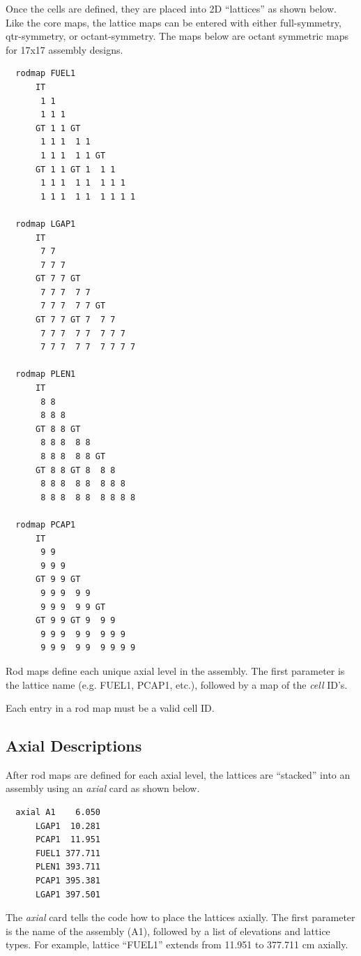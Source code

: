 Once the cells are defined, they are placed into 2D ``lattices'' as shown below.
Like the core maps, the lattice maps can be entered with either full-symmetry, qtr-symmetry,
or octant-symmetry.  The maps below are octant symmetric maps for 17x17 assembly designs.
\vfill   %
\begin{verbatim}
  rodmap FUEL1
      IT
       1 1
       1 1 1
      GT 1 1 GT
       1 1 1  1 1
       1 1 1  1 1 GT
      GT 1 1 GT 1  1 1
       1 1 1  1 1  1 1 1
       1 1 1  1 1  1 1 1 1

  rodmap LGAP1
      IT
       7 7
       7 7 7
      GT 7 7 GT
       7 7 7  7 7
       7 7 7  7 7 GT
      GT 7 7 GT 7  7 7
       7 7 7  7 7  7 7 7
       7 7 7  7 7  7 7 7 7

  rodmap PLEN1
      IT
       8 8
       8 8 8
      GT 8 8 GT
       8 8 8  8 8
       8 8 8  8 8 GT
      GT 8 8 GT 8  8 8
       8 8 8  8 8  8 8 8
       8 8 8  8 8  8 8 8 8

  rodmap PCAP1
      IT
       9 9
       9 9 9
      GT 9 9 GT
       9 9 9  9 9
       9 9 9  9 9 GT
      GT 9 9 GT 9  9 9
       9 9 9  9 9  9 9 9
       9 9 9  9 9  9 9 9 9
\end{verbatim}

Rod maps define each unique axial level in the assembly.
The first parameter is the lattice name (e.g. FUEL1, PCAP1, etc.),
followed by a map of the {\it cell} ID's.

Each entry in a rod map must be a valid cell ID.

\subsection{Axial Descriptions}

After rod maps are defined for each axial level, the lattices are ``stacked'' into
an assembly using an {\it axial} card as shown below.

\begin{verbatim}
  axial A1    6.050
      LGAP1  10.281
      PCAP1  11.951
      FUEL1 377.711
      PLEN1 393.711
      PCAP1 395.381
      LGAP1 397.501
\end{verbatim}

The {\it axial} card tells the code how to place the lattices axially.
The first parameter is the name of the assembly (A1), followed by a
list of elevations and lattice types.
For example, lattice ``FUEL1'' extends from 11.951 to 377.711 cm axially.

